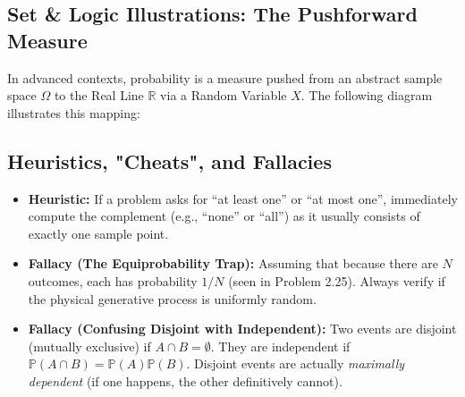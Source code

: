 \documentclass[11pt]{article}
\begin{document}
\subsection{Set \& Logic Illustrations: The Pushforward Measure}
In advanced contexts, probability is a measure pushed from an abstract sample space $\Omega$ to the Real Line $\mathbb{R}$ via a Random Variable $X$. The following diagram illustrates this mapping:

\vspace{5mm}
\begin{center}
\end{center}
\vspace{2mm}

\subsection{Heuristics, "Cheats", and Fallacies}
\begin{itemize}
    \item \textbf{Heuristic:} If a problem asks for ``at least one'' or ``at most one'', immediately compute the complement (e.g., ``none'' or ``all'') as it usually consists of exactly one sample point.
    \item \textbf{Fallacy (The Equiprobability Trap):} Assuming that because there are $N$ outcomes, each has probability $1/N$ (seen in Problem 2.25). Always verify if the physical generative process is uniformly random.
    \item \textbf{Fallacy (Confusing Disjoint with Independent):} Two events are disjoint (mutually exclusive) if $A \cap B = \emptyset$. They are independent if $\mathbb{P}(A \cap B) = \mathbb{P}(A)\mathbb{P}(B)$. Disjoint events are actually \textit{maximally dependent} (if one happens, the other definitively cannot).
\end{itemize}
\end{document}

